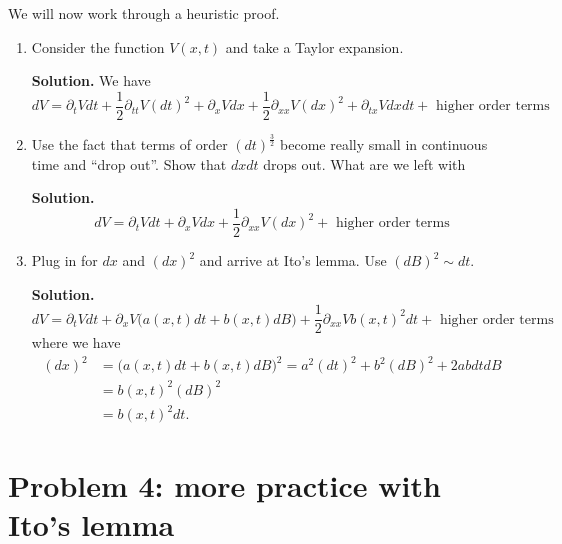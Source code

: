 \documentclass[11pt]{extarticle}
\theoremstyle{plain}
\theoremstyle{definition}
\begin{document}
\vspace{5mm}
\noindent
We will now work through a heuristic proof.
\begin{enumerate}
\item Consider the function $V(x, t)$ and take a Taylor expansion.

\vspace{5mm}
\noindent
\textbf{Solution.} We have 
\begin{equation*}
	dV = \partial_t V dt + \frac{1}{2} \partial_{tt} V (dt)^2 + \partial_x V dx + \frac{1}{2} \partial_{xx} V (dx)^2 + \partial_{tx} V dx dt + \text{ higher order terms}
\end{equation*}


\item Use the fact that terms of order $(dt)^\frac{3}{2}$ become really small in continuous time and ``drop out''. Show that $dx dt$ drops out. What are we left with

\vspace{5mm}
\noindent
\textbf{Solution.} 
\begin{equation*}
	dV = \partial_t V dt + \partial_x V dx + \frac{1}{2} \partial_{xx} V (dx)^2 + \text{ higher order terms}
\end{equation*}


\item Plug in for $dx$ and $(dx)^2$ and arrive at Ito's lemma. Use $(dB)^2 \sim dt$.

\vspace{5mm}
\noindent
\textbf{Solution.} 
\begin{equation*}
	dV = \partial_t V dt + \partial_x V \Big( a(x, t) dt + b(x, t) dB \Big) + \frac{1}{2} \partial_{xx} V b(x, t)^2 dt + \text{ higher order terms}
\end{equation*}
where we have
\begin{align*}
	(dx)^2 &= \Big( a(x, t) dt + b(x, t) dB \Big)^2 = a^2 (dt)^2 + b^2 (dB)^2 + 2 a b dt dB \\
	&= b(x, t)^2 (dB)^2 \\
	&= b(x, t)^2 dt.
\end{align*}
\end{enumerate}




\vspace{10mm}
\section*{Problem 4: more practice with Ito's lemma}
\end{document}
